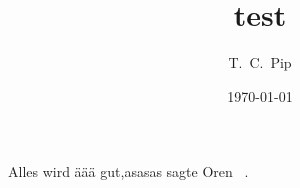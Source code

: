 \documentclass[a4paper,12pt,fleqn]{scrartcl}
\begin{document}
\title{test}
\author{T.\ C.\ Pip}
\date{\today}
\maketitle

Alles wird äää gut,asasas sagte Oren~ \cite{bibtex}.

\newpage
{}

\end{document}
